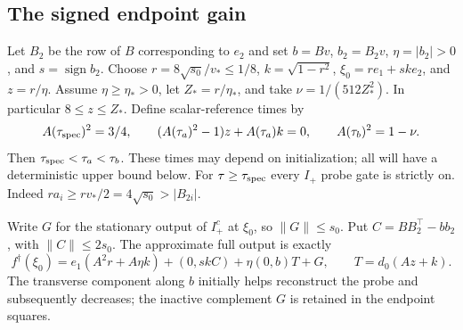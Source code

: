 \documentclass{article} %
\theoremstyle{plain}
\theoremstyle{definition}
\theoremstyle{remark}
\begin{document}
\subsection{The signed endpoint gain}

Let $B_2$ be the row of $B$ corresponding to $e_2$ and set
$b=Bv$, $b_2=B_2v$, $\eta=|b_2|>0$, and $s=\operatorname{sign}b_2$.
Choose $r=8\sqrt{s_0}/v_*\le1/8$, $k=\sqrt{1-r^2}$,
$\xi_0=re_1+sk e_2$, and $z=r/\eta$.
Assume $\eta\ge\eta_*>0$, let $Z_*=r/\eta_*$, and take
$\nu=1/(512Z_*^2)$. In particular $8\le z\le Z_*$.
Define scalar-reference times by
\begin{equation}\label{sbsep:snapshot-times}
 A(\tau_{\rm spec})^2=3/4,\qquad
 (A(\tau_a)^2-1)z+A(\tau_a)k=0,\qquad
 A(\tau_b)^2=1-\nu.
\end{equation}
Then $\tau_{\rm spec}<\tau_a<\tau_b$. These times may depend on
initialization; all will have a deterministic upper bound below.
For $\tau\ge\tau_{\rm spec}$ every $I_+$ probe gate is strictly on.
Indeed $ra_i\ge rv_*/2=4\sqrt{s_0}>|B_{2i}|$.

Write $G$ for the stationary output of $I_+^c$ at $\xi_0$, so
$\|G\|\le s_0$. Put $C=BB_2^\top-bb_2$, with $\|C\|\le2s_0$.
The approximate full output is exactly
\begin{equation}\label{sbsep:probe-reference}
 f^\dagger(\xi_0)=
 e_1(A^2r+A\eta k)+(0,skC)+\eta(0,b)T+G,
 \qquad T=d_0(Az+k).
\end{equation}
The transverse component along $b$ initially helps reconstruct the
probe and subsequently decreases; the inactive complement $G$ is
retained in the endpoint squares.
\end{document}
